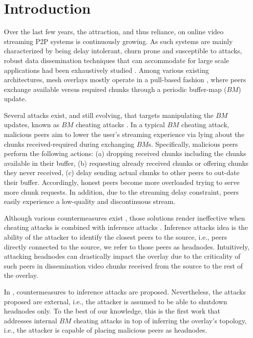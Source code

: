 \section{Introduction}
\label{sec:intro}

Over the last few years, the attraction, and thus reliance, on online video streaming P2P systems is continuously growing. 
As such systems are mainly characterized by being delay intolerant, churn prone and susceptible to attacks, robust data dissemination techniques that can accommodate for large scale applications had been exhaustively studied \cite{sasi2014survey}.
Among various existing architectures, mesh overlays mostly operate in a pull-based fashion \cite{zhang2014modeling}, where peers exchange available versus required chunks through a periodic buffer-map ($BM$) update.

Several attacks exist, and still evolving, that targets manipulating the $BM$ updates, known as $BM$ cheating attacks \cite{cheatingAnalysis}.
In a typical $BM$ cheating attack, malicious peers aim to lower the user's streaming experience via lying about the chunks received-required during exchanging $BM$s. 
Specifically, malicious peers perform the following actions: 
(a) dropping received chunks including the chunks available in their buffer,
(b) requesting already received chunks or offering chunks they never received,
(c) delay sending actual chunks to other peers to out-date their buffer.
Accordingly, honest peers become more overloaded trying to serve more chunk requests.
In addition, due to the streaming delay constraint, peers easily experience a low-quality and discontinuous stream.

Although various countermeasures exist \cite{zhang2005coolstreaming, defending2, antiliar}, those solutions render ineffective when cheating attacks is combined with inference attacks \cite{nguyen2016swap,4395124,rbcs}.
Inference attacks idea is the ability of the attacker to identify the closest peers to the source, i.e., peers directly connected to the source, we refer to those peers as headnodes.
Intuitively, attacking headnodes can drastically impact the overlay due to the criticality of such peers in dissemination video chunks received from the source to the rest of the overlay.

In \cite{nguyen2016swap, rbcs, nguyen2014resilience}, countermeasures to inference attacks are proposed. 
Nevertheless, the attacks proposed are external, i.e., the attacker is assumed to be able to shutdown headnodes only.
To the best of our knowledge, this is the first work that addresses internal $BM$ cheating attacks in top of inferring the overlay's topology, i.e., the attacker is capable of placing malicious peers as headnodes.

